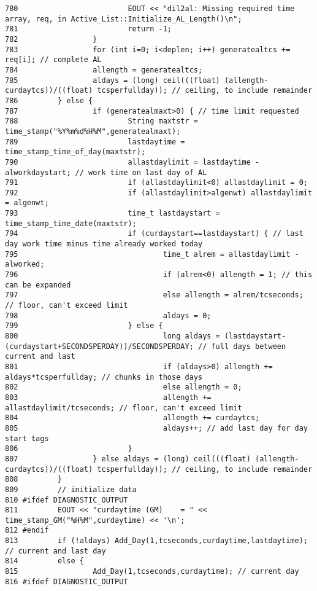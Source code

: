 \begin{verbatim}
780                         EOUT << "dil2al: Missing required time array, req, in Active_List::Initialize_AL_Length()\n";
781                         return -1;
782                 }
783                 for (int i=0; i<deplen; i++) generatealtcs += req[i]; // complete AL
784                 allength = generatealtcs;
785                 aldays = (long) ceil(((float) (allength-curdaytcs))/((float) tcsperfullday)); // ceiling, to include remainder
786         } else {
787                 if (generatealmaxt>0) { // time limit requested
788                         String maxtstr = time_stamp("%Y%m%d%H%M",generatealmaxt);
789                         lastdaytime = time_stamp_time_of_day(maxtstr);
790                         allastdaylimit = lastdaytime - alworkdaystart; // work time on last day of AL
791                         if (allastdaylimit<0) allastdaylimit = 0;
792                         if (allastdaylimit>algenwt) allastdaylimit = algenwt;
793                         time_t lastdaystart = time_stamp_time_date(maxtstr);
794                         if (curdaystart==lastdaystart) { // last day work time minus time already worked today
795                                 time_t alrem = allastdaylimit - alworked;
796                                 if (alrem<0) allength = 1; // this can be expanded
797                                 else allength = alrem/tcseconds; // floor, can't exceed limit
798                                 aldays = 0;
799                         } else {
800                                 long aldays = (lastdaystart-(curdaystart+SECONDSPERDAY))/SECONDSPERDAY; // full days between current and last
801                                 if (aldays>0) allength += aldays*tcsperfullday; // chunks in those days
802                                 else allength = 0;
803                                 allength += allastdaylimit/tcseconds; // floor, can't exceed limit
804                                 allength += curdaytcs;
805                                 aldays++; // add last day for day start tags
806                         }
807                 } else aldays = (long) ceil(((float) (allength-curdaytcs))/((float) tcsperfullday)); // ceiling, to include remainder
808         }
809         // initialize data
810 #ifdef DIAGNOSTIC_OUTPUT
811         EOUT << "curdaytime (GM)    = " << time_stamp_GM("%H%M",curdaytime) << '\n';
812 #endif
813         if (!aldays) Add_Day(1,tcseconds,curdaytime,lastdaytime); // current and last day
814         else {
815                 Add_Day(1,tcseconds,curdaytime); // current day
816 #ifdef DIAGNOSTIC_OUTPUT

\end{verbatim}

